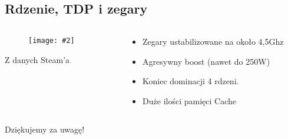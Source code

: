 \documentclass[aspectratio=169]{beamer}
\newcommand{\obrazek}[2]{
\begin{figure}[h]
    \centering
    \texttt{[image: \#2]}
\end{figure}
}
\begin{document}
\subsection{Rdzenie, TDP i zegary}
\begin{frame}
    \begin{columns}
        \begin{column}{.6\textwidth}
            \obrazek{.3}{steamhw.png}
            \begin{center}
                \tiny{Z danych Steam'a}
            \end{center}
        \end{column}
        \begin{column}{.4\textwidth}
            \begin{itemize}
                \item Zegary ustabilizowane na około 4,5Ghz
                \item Agresywny boost (nawet do 250W)
                \item Koniec dominacji 4 rdzeni.
                \item Duże ilości pamięci Cache
            \end{itemize}
        \end{column}
    \end{columns}
\end{frame}

\begin{frame}
    \begin{center}
        \Large{Dziękujemy za uwagę!}
    \end{center}
\end{frame}
\end{document}
